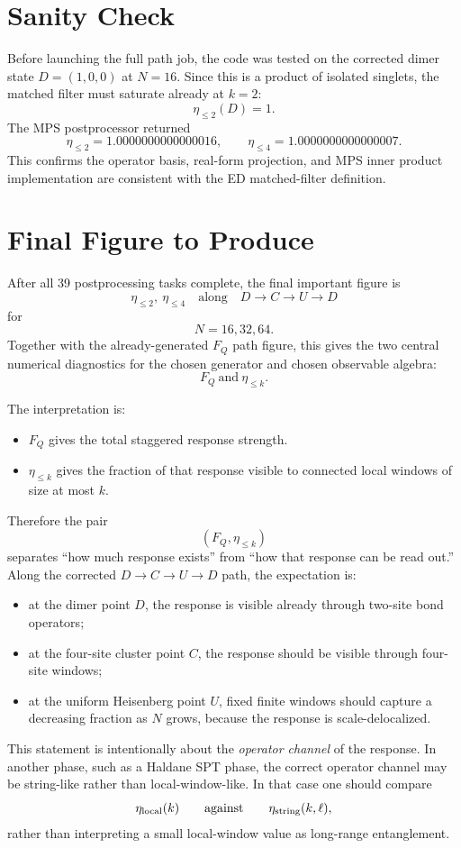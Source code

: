 \documentclass[11pt]{article}
\newcommand{\FQ}{F_Q}
\begin{document}
\section{Sanity Check}

Before launching the full path job, the code was tested on the corrected
dimer state $D=(1,0,0)$ at $N=16$.  Since this is a product of isolated
singlets, the matched filter must saturate already at $k=2$:
\[
  \eta_{\le2}(D)=1.
\]
The MPS postprocessor returned
\[
  \eta_{\le2}=1.0000000000000016,
  \qquad
  \eta_{\le4}=1.0000000000000007.
\]
This confirms the operator basis, real-form projection, and MPS inner
product implementation are consistent with the ED matched-filter
definition.

\section{Final Figure to Produce}

After all 39 postprocessing tasks complete, the final important figure is
\[
  \eta_{\le2},\ \eta_{\le4}
  \quad\text{along}\quad
  D\to C\to U\to D
\]
for
\[
  N=16,32,64.
\]
Together with the already-generated $F_Q$ path figure, this gives the two
central numerical diagnostics for the chosen generator and chosen
observable algebra:
\[
  \boxed{\FQ\ \text{and}\ \eta_{\le k}.}
\]

The interpretation is:
\begin{itemize}
  \item $\FQ$ gives the total staggered response strength.
  \item $\eta_{\le k}$ gives the fraction of that response visible to
  connected local windows of size at most $k$.
\end{itemize}
Therefore the pair
\[
  \left(\FQ,\eta_{\le k}\right)
\]
separates ``how much response exists'' from ``how that response can be
read out.''  Along the corrected
$D\to C\to U\to D$ path, the expectation is:
\begin{itemize}
  \item at the dimer point $D$, the response is visible already through
  two-site bond operators;
  \item at the four-site cluster point $C$, the response should be
  visible through four-site windows;
  \item at the uniform Heisenberg point $U$, fixed finite windows should
  capture a decreasing fraction as $N$ grows, because the response is
  scale-delocalized.
\end{itemize}
This statement is intentionally about the \emph{operator channel} of the
response.  In another phase, such as a Haldane SPT phase, the correct
operator channel may be string-like rather than local-window-like.  In
that case one should compare
\[
  \eta_{\rm local}(k)
  \qquad\text{against}\qquad
  \eta_{\rm string}(k,\ell),
\]
rather than interpreting a small local-window value as long-range
entanglement.
\end{document}
